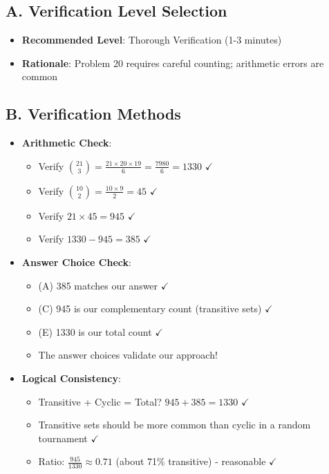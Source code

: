 \documentclass[]{article}
\begin{document}
\begin{verificationbox}
\subsection*{A. Verification Level Selection}
\begin{itemize}[leftmargin=*]
    \item \textbf{Recommended Level}: Thorough Verification (1-3 minutes)
    \item \textbf{Rationale}: Problem 20 requires careful counting; arithmetic errors are common
\end{itemize}

\subsection*{B. Verification Methods}
\begin{itemize}[leftmargin=*]
    \item \textbf{Arithmetic Check}:
    \begin{itemize}
        \item Verify $\binom{21}{3} = \frac{21 \times 20 \times 19}{6} = \frac{7980}{6} = 1330$ $\checkmark$
        \item Verify $\binom{10}{2} = \frac{10 \times 9}{2} = 45$ $\checkmark$
        \item Verify $21 \times 45 = 945$ $\checkmark$
        \item Verify $1330 - 945 = 385$ $\checkmark$
    \end{itemize}
    \item \textbf{Answer Choice Check}:
    \begin{itemize}
        \item (A) 385 matches our answer $\checkmark$
        \item (C) 945 is our complementary count (transitive sets) $\checkmark$
        \item (E) 1330 is our total count $\checkmark$
        \item The answer choices validate our approach!
    \end{itemize}
    \item \textbf{Logical Consistency}:
    \begin{itemize}
        \item Transitive + Cyclic = Total? $945 + 385 = 1330$ $\checkmark$
        \item Transitive sets should be more common than cyclic in a random tournament $\checkmark$
        \item Ratio: $\frac{945}{1330} \approx 0.71$ (about 71\% transitive) - reasonable $\checkmark$
    \end{itemize}
\end{itemize}


\end{verificationbox}
\end{document}
